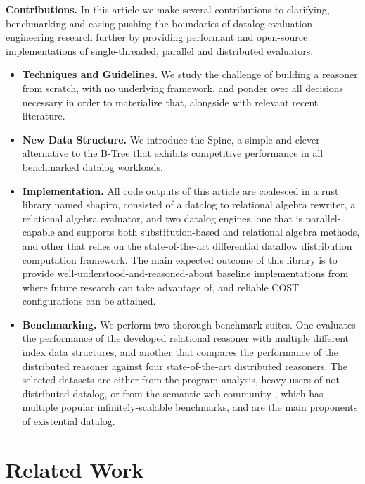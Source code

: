 \documentclass[manuscript,screen,review]{acmart}
\theoremstyle{definition}
\begin{document}
\textbf{Contributions.} In this article we make several contributions to clarifying, benchmarking
and easing pushing the boundaries of datalog evaluation engineering research further by
providing performant and open-source implementations of single-threaded, parallel and distributed evaluators.

\begin{itemize}
	\item \textbf{Techniques and Guidelines.} We study the challenge of building a reasoner from scratch,
	      with no underlying framework, and ponder over all decisions necessary in order to materialize that,
	      alongside with relevant recent literature.
	\item \textbf{New Data Structure.} We introduce the Spine, a simple and clever alternative to the B-Tree that
	      exhibits competitive performance in all benchmarked datalog workloads.
	\item \textbf{Implementation.} All code outputs of this article are coalesced in a rust library named shapiro,
	      consisted of a datalog to relational algebra rewriter, a relational algebra evaluator, and two datalog engines,
	      one that is parallel-capable and supports both substitution-based and relational algebra methods, and other that
	      relies on the state-of-the-art differential dataflow\cite{differential_dataflow} distribution computation framework.
	      The main expected outcome of this library is to provide well-understood-and-reasoned-about baseline implementations
	      from where future research can take advantage of, and reliable COST configurations can be attained.
	\item \textbf{Benchmarking.} We perform two thorough benchmark suites. One evaluates the performance of the developed
	      relational reasoner with multiple different index data structures, and another that compares the performance
	      of the distributed reasoner against four state-of-the-art distributed reasoners. The selected datasets are either
	      from the program analysis, heavy users of not-distributed datalog, or from the semantic web community
	      , which has multiple popular infinitely-scalable benchmarks, and are the main proponents of existential datalog.
\end{itemize}

\section{Related Work}
\end{document}
